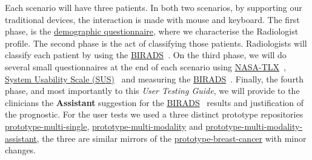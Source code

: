 Each scenario will have three patients. In both two scenarios, by supporting our traditional devices, the interaction is made with mouse and keyboard. The first phase, is the \hyperlink{https://docs.google.com/forms/d/1cGmaCGZjeLJhUl_My2wxJ7gcpm7vQRxYhds6Ys0NoSc/edit?usp=sharing}{demographic questionnaire}, where we characterise the Radiologist profile. The second phase is the act of classifying those patients. Radiologists will classify each patient by using the \hyperlink{https://en.wikipedia.org/wiki/BI-RADS}{BIRADS}~\cite{balleyguier2007birads}. On the third phase, we will do several small questionnaires at the end of each scenario using \hyperlink{https://en.wikipedia.org/wiki/NASA-TLX}{NASA-TLX}~\cite{ramkumar2017using}, \hyperlink{https://en.wikipedia.org/wiki/System_usability_scale}{System Usability Scale (SUS)}~\cite{orfanou2015perceived} and measuring the \hyperlink{https://en.wikipedia.org/wiki/BI-RADS}{BIRADS}~\cite{balleyguier2007birads}. Finally, the fourth phase, and most importantly to this \textit{User Testing Guide}, we will provide to the clinicians the \textbf{Assistant} suggestion for the \hyperlink{https://en.wikipedia.org/wiki/BI-RADS}{BIRADS}~\cite{balleyguier2007birads} results and justification of the prognostic. For the user tests we used a three distinct prototype repositories \hyperlink{https://github.com/MIMBCD-UI/prototype-multi-single}{prototype-multi-single}, \hyperlink{https://github.com/MIMBCD-UI/prototype-multi-modality}{prototype-multi-modality} and \hyperlink{https://github.com/mida-project/prototype-multi-modality-assistant}{prototype-multi-modality-assistant}, the three are similar mirrors of the \hyperlink{https://github.com/MIMBCD-UI/prototype-breast-cancer}{prototype-breast-cancer} with minor changes.